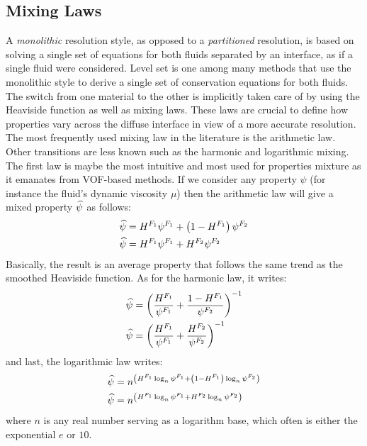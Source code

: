 \subsection{Mixing Laws} \label{sec:mixinglaws}

A \emph{monolithic} resolution style, as opposed to a \emph{partitioned} resolution, is based on solving a single set of equations
for both fluids separated by an interface, as if a single fluid were considered. 
Level set is one among many methods that use the monolithic style to derive a single set of conservation equations
for both fluids. The switch from one material to the other is implicitly taken care of by using the Heaviside function as well as mixing laws. 
These laws are crucial to define how properties vary across the diffuse interface in view of a more accurate resolution.
The most frequently used mixing law in the literature is the arithmetic law. Other transitions are less known such as 
the harmonic and logarithmic mixing. The first law is maybe the most intuitive and most used for properties mixture as it emanates
from VOF-based methods. If we consider any property $\psi$ (for instance the fluid's dynamic viscosity $\mu$) then the arithmetic 
law will give a mixed property $\widehat{\psi}$ as follows:
\begin{subequations}
\begin{align}
\label{eq:arithmetic}
\widehat{\psi} &= H^{F_1} \psi^{F_1} + \left( 1-H^{F_1} \right) \psi^{F_2} \\
\widehat{\psi} &= H^{F_1} \psi^{F_1} + H^{F_2} \psi^{F_2}
\end{align}
\end{subequations}
Basically, the result is an average property that follows the same trend as the smoothed Heaviside function. As for the harmonic law, it writes:
\begin{subequations}
\begin{align}
\label{eq:harmonic}
\widehat{\psi} &= \left( \frac{H^{F_1}}{\psi^{F_1}} + \frac{1-H^{F_1}}{\psi^{F_2}}  \right)^{-1} \\
\widehat{\psi} &= \left( \frac{H^{F_1}}{\psi^{F_1}} + \frac{H^{F_2}}{\psi^{F_2}}  \right)^{-1}
\end{align}
\end{subequations}
and last, the logarithmic law writes:
\begin{subequations}
\begin{align}
\label{eq:logarithmic}
\widehat{\psi} &=  n^{\left( H^{F_1} \log_n \psi^{F_1} + \left( 1-H^{F_1} \right) \log_n \psi^{F_2} \right)} \\
\widehat{\psi} &=  n^{\left( H^{F_1} \log_n \psi^{F_1} + H^{F_2} \log_n \psi^{F_2} \right)}
\end{align}
\end{subequations}
where $n$ is any real number serving as a logarithm base, which often is either the exponential $e$ or $10$.

